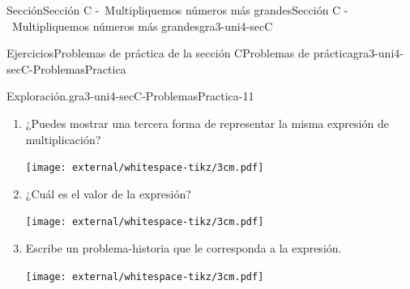 \begin{sectionptx}{Sección}{Sección C -~Multipliquemos números más grandes}{}{Sección C -~Multipliquemos números más grandes}{}{}{gra3-uni4-secC}
\begin{exercises-subsection}{Ejercicios}{Problemas de práctica de la sección C}{}{Problemas de práctica}{}{}{gra3-uni4-secC-ProblemasPractica}
\begin{divisionexercise}{9}{Exploración.}{}{gra3-uni4-secC-ProblemasPractica-11}
\begin{enumerate}[label={(\alph*)}]
\begin{image}{0}{1}{0}{}%
\texttt{[image: external/whitespace-tikz/3cm.pdf]}
\end{image}%
\item{}¿Puedes mostrar una tercera forma de representar la misma expresión de multiplicación?%
\begin{image}{0}{1}{0}{}%
\texttt{[image: external/whitespace-tikz/3cm.pdf]}
\end{image}%
\item{}¿Cuál es el valor de la expresión?%
\begin{image}{0}{1}{0}{}%
\texttt{[image: external/whitespace-tikz/3cm.pdf]}
\end{image}%
\item{}Escribe un problema-historia que le corresponda a la expresión.%
\begin{image}{0}{1}{0}{}%
\texttt{[image: external/whitespace-tikz/3cm.pdf]}
\end{image}%
\end{enumerate}
\end{divisionexercise}%
\end{exercises-subsection}
\end{sectionptx}
%
%
\typeout{************************************************}
\typeout{************************************************}
%
